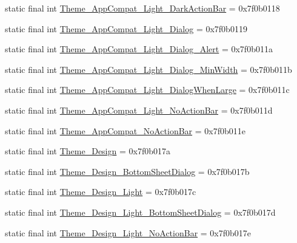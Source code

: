 \begin{CompactItemize}
\item 
static final int \hyperlink{classandroid_1_1support_1_1mediacompat_1_1_r_1_1style_800bcfdafa35e331d18bd35d8fca5275}{Theme\_\-AppCompat\_\-Light\_\-DarkActionBar} = 0x7f0b0118
\item 
static final int \hyperlink{classandroid_1_1support_1_1mediacompat_1_1_r_1_1style_cdcbf5721cd833ba1acda8a727086790}{Theme\_\-AppCompat\_\-Light\_\-Dialog} = 0x7f0b0119
\item 
static final int \hyperlink{classandroid_1_1support_1_1mediacompat_1_1_r_1_1style_280f6d0b5405e27b8324d6d1dab1056c}{Theme\_\-AppCompat\_\-Light\_\-Dialog\_\-Alert} = 0x7f0b011a
\item 
static final int \hyperlink{classandroid_1_1support_1_1mediacompat_1_1_r_1_1style_5a5e6ea9bbabe0f1cc42c84119bcb178}{Theme\_\-AppCompat\_\-Light\_\-Dialog\_\-MinWidth} = 0x7f0b011b
\item 
static final int \hyperlink{classandroid_1_1support_1_1mediacompat_1_1_r_1_1style_4dfa32e17cbae502d876e630444a76d2}{Theme\_\-AppCompat\_\-Light\_\-DialogWhenLarge} = 0x7f0b011c
\item 
static final int \hyperlink{classandroid_1_1support_1_1mediacompat_1_1_r_1_1style_cb58c09762ec71115a66a9274ef3043e}{Theme\_\-AppCompat\_\-Light\_\-NoActionBar} = 0x7f0b011d
\item 
static final int \hyperlink{classandroid_1_1support_1_1mediacompat_1_1_r_1_1style_71f30486df3d85cc38925925fb794097}{Theme\_\-AppCompat\_\-NoActionBar} = 0x7f0b011e
\item 
static final int \hyperlink{classandroid_1_1support_1_1mediacompat_1_1_r_1_1style_a90184c7fef2f5ae86cff59ea8553fe5}{Theme\_\-Design} = 0x7f0b017a
\item 
static final int \hyperlink{classandroid_1_1support_1_1mediacompat_1_1_r_1_1style_37d614d153995c2ac31bbdd240408020}{Theme\_\-Design\_\-BottomSheetDialog} = 0x7f0b017b
\item 
static final int \hyperlink{classandroid_1_1support_1_1mediacompat_1_1_r_1_1style_74ed5b5323f44be9d43ce83fe25d7da1}{Theme\_\-Design\_\-Light} = 0x7f0b017c
\item 
static final int \hyperlink{classandroid_1_1support_1_1mediacompat_1_1_r_1_1style_c91bd36fa75f565f0bf89945f3cfc15b}{Theme\_\-Design\_\-Light\_\-BottomSheetDialog} = 0x7f0b017d
\item 
static final int \hyperlink{classandroid_1_1support_1_1mediacompat_1_1_r_1_1style_79d135fd272b9efba7e3d571f8af4eec}{Theme\_\-Design\_\-Light\_\-NoActionBar} = 0x7f0b017e
\item 

\end{CompactItemize}
